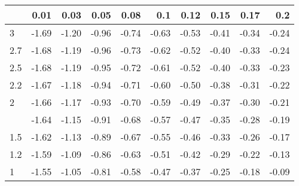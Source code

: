 
\begin{tabular}{lrrrrrrrrr}
\toprule
  & 0.01 & 0.03 & 0.05 & 0.08 & 0.1 & 0.12 & 0.15 & 0.17 & 0.2\\
\midrule
3 & -1.69 & -1.20 & -0.96 & -0.74 & -0.63 & -0.53 & -0.41 & -0.34 & -0.24\\
2.7 & -1.68 & -1.19 & -0.96 & -0.73 & -0.62 & -0.52 & -0.40 & -0.33 & -0.24\\
2.5 & -1.68 & -1.19 & -0.95 & -0.72 & -0.61 & -0.52 & -0.40 & -0.33 & -0.23\\
2.2 & -1.67 & -1.18 & -0.94 & -0.71 & -0.60 & -0.50 & -0.38 & -0.31 & -0.22\\
2 & -1.66 & -1.17 & -0.93 & -0.70 & -0.59 & -0.49 & -0.37 & -0.30 & -0.21\\
\addlinespace
1.7 & -1.64 & -1.15 & -0.91 & -0.68 & -0.57 & -0.47 & -0.35 & -0.28 & -0.19\\
1.5 & -1.62 & -1.13 & -0.89 & -0.67 & -0.55 & -0.46 & -0.33 & -0.26 & -0.17\\
1.2 & -1.59 & -1.09 & -0.86 & -0.63 & -0.51 & -0.42 & -0.29 & -0.22 & -0.13\\
1 & -1.55 & -1.05 & -0.81 & -0.58 & -0.47 & -0.37 & -0.25 & -0.18 & -0.09\\
\bottomrule
\end{tabular}
